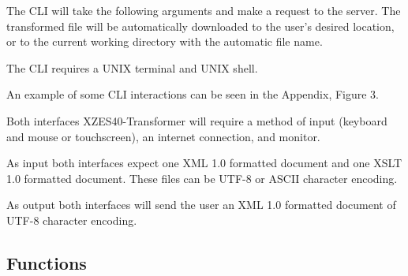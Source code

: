 The CLI will take the following arguments and make a  request to the server.
The transformed file will be automatically downloaded to the user's desired location, or to the current working directory with the automatic file name.

The CLI requires a UNIX terminal and UNIX shell.

An example of some CLI interactions can be seen in the Appendix, Figure 3.

Both interfaces XZES40-Transformer will require a method of input (keyboard and mouse or touchscreen), an internet connection, and monitor.

As input both interfaces expect one XML 1.0 formatted document and one XSLT 1.0 formatted document.
These files can be UTF-8 or ASCII character encoding.

As output both interfaces will send the user an XML 1.0 formatted document of UTF-8 character encoding.

% 

\subsection{Functions}

